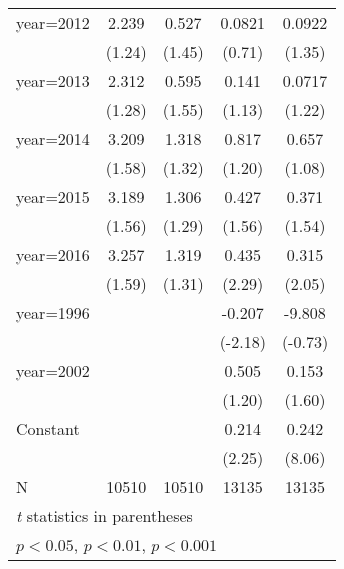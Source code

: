 \begin{table}[htbp]
\begin{tabular}{l*{4}{c}}
\addlinespace
year=2012           &       2.239         &       0.527         &      0.0821         &      0.0922         \\
                    &      (1.24)         &      (1.45)         &      (0.71)         &      (1.35)         \\
\addlinespace
year=2013           &       2.312         &       0.595         &       0.141         &      0.0717         \\
                    &      (1.28)         &      (1.55)         &      (1.13)         &      (1.22)         \\
\addlinespace
year=2014           &       3.209         &       1.318         &       0.817         &       0.657         \\
                    &      (1.58)         &      (1.32)         &      (1.20)         &      (1.08)         \\
\addlinespace
year=2015           &       3.189         &       1.306         &       0.427         &       0.371         \\
                    &      (1.56)         &      (1.29)         &      (1.56)         &      (1.54)         \\
\addlinespace
year=2016           &       3.257         &       1.319         &       0.435\sym{*}  &       0.315\sym{*}  \\
                    &      (1.59)         &      (1.31)         &      (2.29)         &      (2.05)         \\
\addlinespace
year=1996           &                     &                     &      -0.207\sym{*}  &      -9.808         \\
                    &                     &                     &     (-2.18)         &     (-0.73)         \\
\addlinespace
year=2002           &                     &                     &       0.505         &       0.153         \\
                    &                     &                     &      (1.20)         &      (1.60)         \\
\addlinespace
Constant            &                     &                     &       0.214\sym{*}  &       0.242\sym{***}\\
                    &                     &                     &      (2.25)         &      (8.06)         \\
\midrule
N                   &       10510         &       10510         &       13135         &       13135         \\
\bottomrule
\multicolumn{5}{l}{\footnotesize \textit{t} statistics in parentheses}\\
\multicolumn{5}{l}{\footnotesize \sym{*} \(p<0.05\), \sym{**} \(p<0.01\), \sym{***} \(p<0.001\)}\\
\end{tabular}
\end{table}

